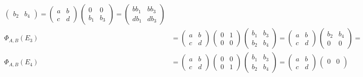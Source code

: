 \begin{enumerate}
\begin{enumerate}
\begin{align*}
\begin{pmatrix}
b_{2} & b_{4}
\end{pmatrix}
 = 
\begin{pmatrix}
a & b \\ 
c & d
\end{pmatrix}
 \,  
\begin{pmatrix}
0 & 0 \\ 
b_{1} & b_{3}
\end{pmatrix}
 = 
\begin{pmatrix}
bb_{1} & bb_{3} \\ 
db_{1} & db_{3}
\end{pmatrix}
  \\
\Phi_{A,B} (E_{3}) &=
\begin{pmatrix}
a & b \\ 
c & d
\end{pmatrix}
 \,  
\begin{pmatrix}
0 & 1 \\ 
0 & 0
\end{pmatrix}
 \,  
\begin{pmatrix}
b_{1} & b_{3} \\ 
b_{2} & b_{4}
\end{pmatrix}
 = 
\begin{pmatrix}
a & b \\ 
c & d
\end{pmatrix}
 \,  
\begin{pmatrix}
b_{2} & b_{4} \\ 
0 & 0
\end{pmatrix}
 = 
\begin{pmatrix}
ab_{2} & ab_{4} \\ 
cb_{2} & cb_{4}
\end{pmatrix}
  \\
\Phi_{A,B} (E_{4}) &=
\begin{pmatrix}
a & b \\ 
c & d
\end{pmatrix}
 \,  
\begin{pmatrix}
0 & 0 \\ 
0 & 1
\end{pmatrix}
 \,  
\begin{pmatrix}
b_{1} & b_{3} \\ 
b_{2} & b_{4}
\end{pmatrix}
 = 
\begin{pmatrix}
a & b \\ 
c & d
\end{pmatrix}
 \,  
\begin{pmatrix}
0 & 0 \\ 

\end{pmatrix}
\end{align*}
\end{enumerate}
\end{enumerate}
